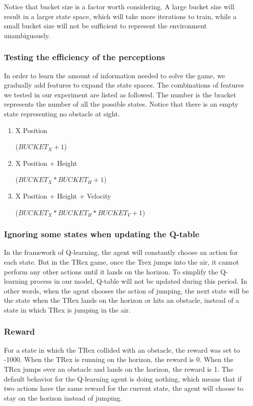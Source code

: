 \documentclass[conference]{IEEEtran}
\begin{document}
Notice that bucket size is a factor worth considering. A large bucket size will result in a larger state space, which will take more iterations to train, while a small bucket size will not be sufficient to represent the environment unambiguously. 

\subsubsection{Testing the efficiency of the perceptions}

In order to learn the amount of information needed to solve the game, we gradually add features to expand the state spaces. The combinations of features we tested in our experiment are listed as followed. The number is the bracket represents the number of all the possible states. Notice that there is an empty state representing no obstacle at sight.
\begin{enumerate}
    \item X Position 
    
    ($BUCKET_X + 1$)
    \item X Position + Height 
    
    ($BUCKET_X * BUCKET_H + 1$)
    \item X Position + Height + Velocity

    ($BUCKET_X * BUCKET_H * BUCKET_V + 1$)
\end{enumerate}

\subsubsection{Ignoring some states when updating the Q-table}

In the framework of Q-learning, the agent will constantly choose an action for each state. But in the TRex game, once the Trex jumps into the air, it cannot perform any other actions until it lands on the horizon. To simplify the Q-learning process in our model, Q-table will not be updated during this period. In other words, when the agent chooses the action of jumping, the next state will be the state when the TRex lands on the horizon or hits an obstacle, instead of a state in which TRex is jumping in the air.

\subsubsection{Reward}

For a state in which the TRex collided with an obstacle, the reward was set to -1000. When the TRex is running on the horizon, the reward is 0. When the TRex jumps over an obstacle and lands on the horizon, the reward is 1. The default behavior for the Q-learning agent is doing nothing, which means that if two actions have the same reward for the current state, the agent will choose to stay on the horizon instead of jumping.
\end{document}
